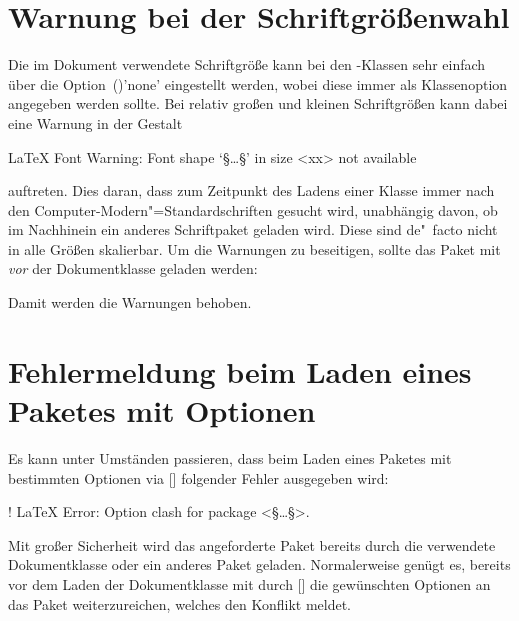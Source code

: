 \section{Warnung bei der Schriftgrößenwahl}
%
%
Die im Dokument verwendete Schriftgröße kann bei den \KOMAScript-Klassen sehr 
einfach über die Option~()'none' 
eingestellt werden, wobei diese immer als Klassenoption angegeben werden 
sollte. Bei relativ großen und kleinen Schriftgrößen kann dabei eine Warnung in 
der Gestalt 
%
\begin{quoting}
\begin{Code}[escapechar=§]
LaTeX Font Warning: Font shape `§\dots§' in size <xx> not available
\end{Code}
\end{quoting}
%
auftreten. Dies daran, dass zum Zeitpunkt des Ladens einer Klasse immer nach 
den Computer-Modern"=Standardschriften gesucht wird, unabhängig davon, ob im 
Nachhinein ein anderes Schriftpaket geladen wird. Diese sind de"~facto nicht 
in alle Größen skalierbar. Um die Warnungen zu beseitigen, sollte das Paket 
 mit  \emph{vor} der Dokumentklasse 
geladen werden:
% 
\begin{quoting}[rightmargin=0pt]
\end{quoting}
%
Damit werden die Warnungen behoben.



\section{Fehlermeldung beim Laden eines Paketes mit Optionen}
%
Es kann unter Umständen passieren, dass beim Laden eines Paketes mit bestimmten 
Optionen via [] 
folgender Fehler ausgegeben wird:
%
\begin{quoting}
\begin{Code}[escapechar=§]
! LaTeX Error: Option clash for package <§\dots§>.
\end{Code}
\end{quoting}
%
Mit großer Sicherheit wird das angeforderte Paket bereits durch die verwendete 
Dokumentklasse oder ein anderes Paket geladen. Normalerweise genügt es, bereits 
vor dem Laden der Dokumentklasse mit  durch 
[] die 
gewünschten Optionen an das Paket weiterzureichen, welches den Konflikt meldet.



